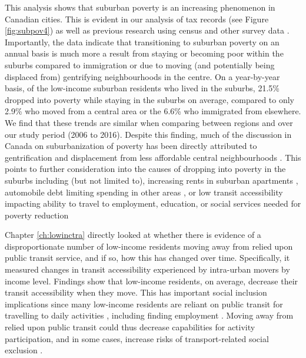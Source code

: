 This analysis shows that suburban poverty is an increasing phenomenon in Canadian cities. This is evident in our analysis of tax records (see Figure \ref{fig:subpov4}) as well as previous research using census and other survey data \cite{ades_are_2012,breau_pulling_2018,grant_changing_2020,allen_suburbanization_2021}. Importantly, the data indicate that transitioning to suburban poverty on an annual basis is much more a result from staying or becoming poor within the suburbs compared to immigration or due to moving (and potentially being displaced from) gentrifying neighbourhoods in the centre. On a year-by-year basis, of the low-income suburban residents who lived in the suburbs, 21.5\% dropped into poverty while staying in the suburbs on average, compared to only 2.9\% who moved from a central area or the 6.6\% who immigrated from elsewhere. We find that these trends are similar when comparing between regions and over our study period (2006 to 2016). Despite this finding, much of the discussion in Canada on suburbanization of poverty has been directly attributed to gentrification and displacement from less affordable central neighbourhoods \cite{grant_changing_2020}. This points to further consideration into the causes of dropping into poverty in the suburbs including (but not limited to), increasing rents in suburban apartments \cite{august_gentrification_2018}, automobile debt limiting spending in other areas \cite{walks_driving_2018}, or low transit accessibility impacting ability to travel to employment, education, or social services needed for poverty reduction \cite{allen_planning_2020} 

Chapter \ref{ch:lowinctra} directly looked at whether there is evidence of a disproportionate number of low-income residents moving away from relied upon public transit service, and if so, how this has changed over time. Specifically, it measured changes in transit accessibility experienced by intra-urban movers by income level. Findings show that low-income residents, on average, decrease their transit accessibility when they move. This has important social inclusion implications since many low-income residents are reliant on public transit for travelling to daily activities \cite{allen_planning_2020,barri_can_2021}, including finding employment \cite{fransen_relationship_2019,bastiaanssen_does_2021}. Moving away from relied upon public transit could thus decrease capabilities for activity participation, and in some cases, increase risks of transport-related social exclusion \cite{lucas_transport_2012,allen_planning_2020}.

